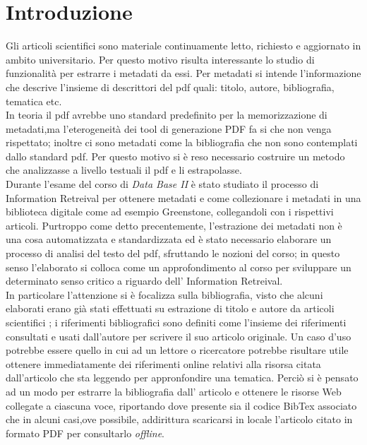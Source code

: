 \section{Introduzione}\label{intro}

Gli articoli scientifici sono materiale continuamente letto, richiesto e aggiornato in ambito universitario. Per questo motivo risulta interessante lo studio di funzionalità per estrarre i metadati da essi. Per metadati si intende l'informazione che descrive l'insieme di descrittori del pdf quali: titolo, autore, bibliografia, tematica etc.\\ In teoria il pdf avrebbe uno standard predefinito per la memorizzazione di metadati,ma l'eterogeneità dei tool di generazione PDF fa si che non venga rispettato; inoltre ci sono metadati come la bibliografia che non sono contemplati dallo standard pdf. Per questo motivo si è reso necessario costruire un metodo che analizzasse a livello testuali il pdf e li estrapolasse.\\
Durante l'esame del corso di \textit{Data Base II} è stato studiato il processo di Information Retreival per ottenere metadati e come collezionare i metadati in una biblioteca digitale come ad esempio Greenstone, collegandoli con i rispettivi articoli. Purtroppo come detto precentemente, l'estrazione dei metadati non è una cosa automatizzata e standardizzata ed è stato necessario elaborare un processo di analisi del testo del pdf, sfruttando le nozioni del corso; in questo senso l'elaborato si colloca come un approfondimento al corso per sviluppare un determinato senso critico a riguardo dell' Information Retreival.\\
In particolare l'attenzione si è focalizza sulla bibliografia, visto che alcuni elaborati erano già stati effettuati su estrazione di titolo e autore da articoli scientifici \cite{Tarocchi}; i riferimenti bibliografici sono definiti come l'insieme dei riferimenti consultati e usati dall'autore per scrivere il suo articolo originale. Un caso d'uso potrebbe essere quello in cui ad un lettore o ricercatore potrebbe risultare utile ottenere immediatamente dei riferimenti online relativi alla risorsa citata dall'articolo che sta leggendo per appronfondire una tematica. Perciò si è pensato ad un modo per estrarre la bibliografia dall' articolo e ottenere le risorse Web collegate a ciascuna voce, riportando dove presente sia il codice BibTex associato che in alcuni casi,ove possibile, addirittura scaricarsi in locale l'articolo citato in formato PDF per consultarlo \textit{offline}.\\

